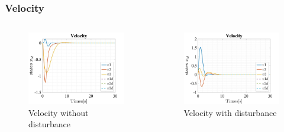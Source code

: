 \documentclass{beamer}
\begin{document}
\begin{frame}
    \frametitle{Velocity}

    \begin{columns}

        \begin{figure}[h]
            \centering
            \includegraphics[width=1\textwidth]{Velocity_T_LQR.jpg}
            \caption{Velocity without disturbance}
        \end{figure}

        \begin{figure}[h]
            \centering
            \includegraphics[width=1\textwidth]{Velocity_T_LQR_Dist.jpg}
            \caption{Velocity with disturbance}
        \end{figure}
    \end{columns}
\end{frame}
\end{document}
